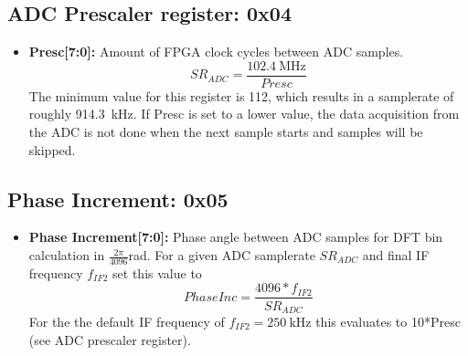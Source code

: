 \documentclass{article}
\newcommand{\bitrect}[2]{
  \begin{pgfonlayer}{foreground}
    \draw [thick] (0,0) rectangle (#1,1);
    \pgfmathsetmacro\result{#1-1}
    \foreach \x in {1,...,\result}
      \draw [thick] (\x,1) -- (\x, 0.8);
  \end{pgfonlayer}
  \bitlabels{#1}{#2}
}
\newcommand{\rwbits}[3]{
  \draw [thick] (#1,0) rectangle ++(#2,1) node[pos=0.5]{#3};
  \pgfmathsetmacro\start{#1+0.5}
  \pgfmathsetmacro\finish{#1+#2-0.5}
}
\newcommand{\robits}[3]{
  \begin{pgfonlayer}{background}
    \draw [thick, fill=lightgray] (#1,0) rectangle ++(#2,1) node[pos=0.5]{#3};
  \end{pgfonlayer}
  \pgfmathsetmacro\start{#1+0.5}
  \pgfmathsetmacro\finish{#1+#2-0.5}
}
\newcommand{\bitlabels}[2]{
  \foreach \bit in {1,...,#1}{
     \pgfmathsetmacro\result{#2}
     \node [above] at (\bit-0.5, 1) {\pgfmathprintnumber{\result}};
   }
}
\begin{document}
\subsection{ADC Prescaler register: 0x04}
\label{reg:ADC}
\begin{center}
\end{center}
\begin{itemize}
\item \textbf{Presc[7:0]:} Amount of FPGA clock cycles between ADC samples.
$$ SR_{ADC} = \frac{\SI{102.4}{\mega\hertz}}{Presc} $$
The minimum value for this register is 112, which results in a samplerate of roughly \SI{914.3}{\kilo\hertz}. If Presc is set to a lower value, the data acquisition from the ADC is not done when the next sample starts and samples will be skipped.
\end{itemize}

\subsection{Phase Increment: 0x05}
\label{reg:phaseinc}
\begin{center}
\end{center}
\begin{itemize}
\item \textbf{Phase Increment[7:0]:} Phase angle between ADC samples for DFT bin calculation in $\frac{2\pi}{4096}$rad.
For a given ADC samplerate $SR_{ADC}$ and final IF frequency $f_{IF2}$ set this value to
$$ PhaseInc = \frac{4096 * f_{IF2}}{SR_{ADC}} $$
For the the default IF frequency of $f_{IF2} = \SI{250}{\kilo\hertz}$ this evaluates to 10*Presc (see ADC prescaler register).
\end{itemize}
\end{document}
